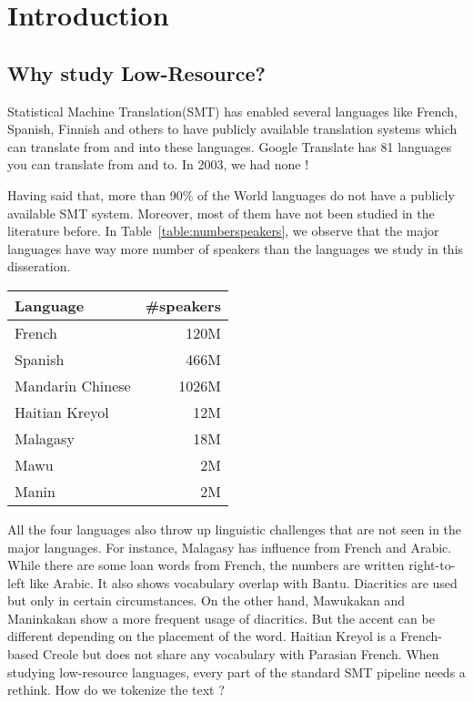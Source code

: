
%
%

\chapter{Introduction}
\label{sec:introduction}

\section{Why study Low-Resource?}
\label{sec:low_resource}
Statistical Machine Translation(SMT) has enabled several languages like French, Spanish, Finnish and others to have publicly available translation systems which can translate from and into these languages. Google Translate has 81 languages you can translate from and to. In 2003, we had none ! 


Having said that, more than 90\% of the World languages do not have a publicly available SMT system. Moreover, most of them have not been studied in the literature before. In Table~\ref{table:numberspeakers}, we observe that the major languages have way more number of speakers than the languages we study in this disseration. 
\begin{table*}
	\begin{tabular}{lr}
	\toprule
	Language & \#speakers \\
	\toprule
	French & 120M \\
	Spanish & 466M \\
	Mandarin Chinese & 1026M \\
	\midrule
	Haitian Kreyol & 12M \\
	Malagasy & 18M \\
	Mawu & 2M \\
	Manin & 2M \\
	\bottomrule
	\end{tabular}
	\caption{Number of speakers for Major and low-resource languages}
	\label{table:numberspeakers}
\end{table*}

All the four languages also throw up linguistic challenges that are not seen in the major languages. For instance, Malagasy has influence from French and Arabic. While there are some loan words from French, the numbers are written right-to-left like Arabic. It also shows vocabulary overlap with Bantu. Diacritics are used but only in certain circumstances. On the other hand, Mawukakan and Maninkakan show a more frequent usage of diacritics. But the accent can be different depending on the placement of the word. Haitian Kreyol is a French-based Creole but does not share any vocabulary with Parasian French. When studying low-resource languages, every part of the standard SMT pipeline needs a rethink. How do we tokenize the text ? 


